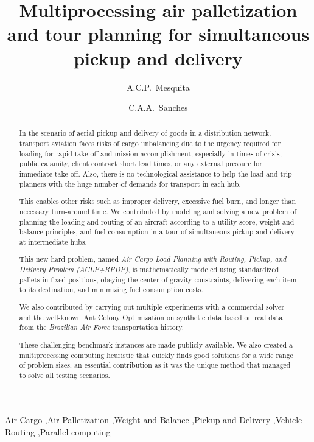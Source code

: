 \documentclass[preprint,authoryear]{elsarticle}
\begin{document}
\begin{frontmatter}

\title{Multiprocessing air palletization and tour planning for simultaneous pickup and delivery}

\author{A.C.P.~Mesquita}

\author{C.A.A.~Sanches}

\address {Instituto Tecnol\'{o}gico de Aeron\'{a}utica - DCTA/ITA/IEC\\
Pra\c{c}a Mal. Eduardo Gomes, 50\\
S\~{a}o Jos\'{e} dos Campos - SP - 12.228-900 - Brazil}


\begin{abstract}

In the scenario of aerial pickup and delivery of goods in a distribution network, transport aviation faces risks of cargo unbalancing due to the urgency required for loading for rapid take-off and mission accomplishment, especially in times of crisis, public calamity, client contract short lead times, or any external pressure for immediate take-off. Also, there is no technological assistance to help the load and trip planners with the huge number of demands for transport in each hub.

This enables other risks such as improper delivery, excessive fuel burn, and longer than necessary turn-around time. We contributed by modeling and solving a new problem of planning the loading and routing of an aircraft according to a utility score, weight and balance principles, and fuel consumption in a tour of simultaneous pickup and delivery at intermediate hubs.

This new hard problem, named {\it Air Cargo Load Planning with Routing, Pickup, and Delivery Problem (ACLP+RPDP)}, is mathematically modeled using standardized pallets in fixed positions, obeying the center of gravity constraints, delivering each item to its destination, and minimizing fuel consumption costs.

We also contributed by carrying out multiple experiments with a commercial solver and the well-known Ant Colony Optimization on synthetic data based on real data from the {\it Brazilian Air Force}\/ transportation history.

These challenging benchmark instances are made publicly available. We also created a multiprocessing computing heuristic that quickly finds good solutions for a wide range of problem sizes, an essential contribution as it was the unique method that managed to solve all testing scenarios.


\end{abstract}

\begin{keyword}
Air Cargo \sep Air Palletization \sep Weight and Balance \sep Pickup and Delivery \sep Vehicle Routing \sep Parallel computing
\end{keyword}

\end{frontmatter}
\end{document}
